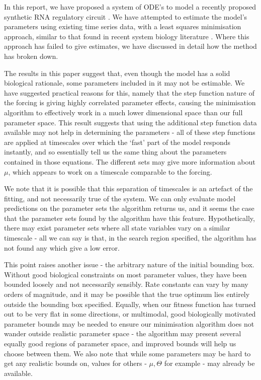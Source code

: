 \documentclass[10pt,journal]{./IEEE_latex_class/IEEEtran}
\begin{document}
In this report, we have proposed a system of ODE's to model a recently proposed synthetic RNA regulatory circuit \cite{Rodrigo2012}. We have attempted to estimate the model's parameters using existing time series data, with a least squares minimisation approach, similar to that found in recent system biology literature \cite{Hu2015}. Where this approach has failed to give estimates, we have discussed in detail how the method has broken down.

 
The results in this paper suggest that, even though the model has a solid biological rationale, some parameters included in it may not be estimable. We have suggested practical reasons for this, namely that the step function nature of the forcing is giving highly correlated parameter effects, causing the minimisation algorithm to effectively work in a much lower dimensional space than our full parameter space. This result suggests that using the additional step function data  available may not help in determining the parameters - all of these step functions are applied at timescales over which the `fast' part of the model responds instantly, and so essentially tell us the same thing about the parameters contained in those equations. The different sets may give more information about $\mu$, which appears to work on a timescale comparable to the forcing.  

We note that it is possible that this separation of timescales is an artefact of the fitting, and not necessarily true of the system. We can only evaluate model predictions on the parameter sets the algorithm returns us, and it seems the case that the parameter sets found by the algorithm have this feature. Hypothetically, there may exist parameter sets where all state variables vary on a similar timescale - all we can say is that, in the search region specified, the algorithm has not found any which give a low error. 

This point raises another issue - the arbitrary nature of the initial bounding box. Without good biological constraints on most parameter values, they have been bounded loosely and not necessarily sensibly. Rate constants can vary by many orders of magnitude, and it may be possible that the true optimum lies entirely outside the bounding box specified. Equally,  when our fitness function has turned out to be very flat in some directions, or multimodal, good biologically motivated parameter bounds may be needed to ensure our minimisation algorithm does not wander outside realistic parameter space - the algorithm may present several equally good regions of parameter space, and improved bounds will help us choose between them. We also note that while some parameters may be hard to get any realistic bounds on, values for others - $\mu, \Theta$ for example - may already be available.
\end{document}
